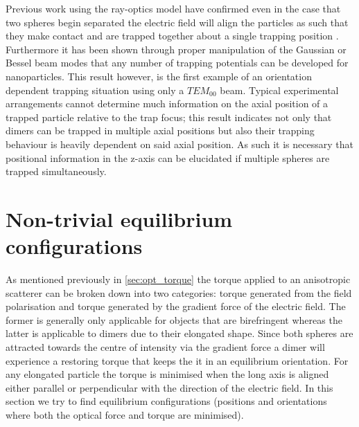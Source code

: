 Previous work using the ray-optics model have confirmed even 
in the case that two spheres begin separated the electric field 
will align the particles as such that they make contact and 
are trapped together about a single trapping position 
\cite{Xu2005}. Furthermore it has been shown through proper 
manipulation of the Gaussian or Bessel beam modes that any 
number of trapping potentials can be developed 
\cite{Shahabadi2020} for nanoparticles. This result however, 
is the first example of an orientation dependent trapping 
situation using only a $TEM_00$ beam. Typical experimental 
arrangements cannot determine much information on the axial 
position of a trapped particle relative to the trap focus; 
this result indicates not only that dimers can be trapped 
in multiple axial positions but also their trapping behaviour 
is heavily dependent on said axial position. As such it is 
necessary that positional information in the z-axis can be 
elucidated if multiple spheres are trapped simultaneously. 

\newpage
\section{Non-trivial equilibrium configurations}
\label{sec:off-axis}
As mentioned previously in \ref{sec:opt_torque} the 
torque applied to an anisotropic scatterer can be 
broken down into two categories: torque generated 
from the field polarisation and torque generated 
by the gradient force of the electric field. The 
former is generally only applicable for objects 
that are birefringent whereas the latter is 
applicable to dimers due to their elongated shape.
Since both spheres are attracted towards the centre
of intensity via the gradient force a dimer will 
experience a restoring torque that keeps the it
in an equilibrium orientation. For any elongated 
particle the torque is minimised when the long 
axis is aligned either parallel or perpendicular
with the direction of the electric field. In this 
section we try to find equilibrium configurations 
(positions and orientations where both the optical
force and torque are minimised).

